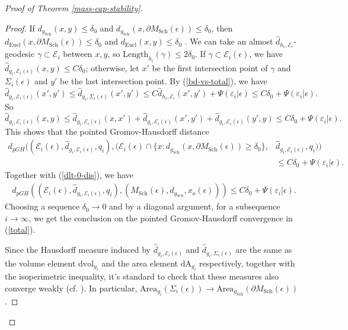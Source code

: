 \documentclass[letter]{amsart}
\theoremstyle{definition}
\theoremstyle{remark}
\def\Area{\mathrm{Area}}
\begin{document}
\begin{proof}[Proof of Theorem \ref{mass-cap-stability}]
\begin{proof}
If $d_{g_{\mathrm{Sch}}}(x,y) \leq \delta _0$ and $d_{g_{\mathrm{Sch}}}(x, \partial M_{\mathrm{Sch}}(\epsilon ) ) \leq \delta _0$, then $d_{\mathrm{Eucl}}(x, \partial M_{\mathrm{Sch}}(\epsilon ) ) \leq \delta _0$ and $d_{\mathrm{Eucl}}(x,y) \leq \delta _0$ . We can take an almost $\hat{d}_{h_i, \mathcal{E}_i}$-geodesic $\gamma \subset \mathcal{E}_i $ between $x,y$, so $\mathrm{Length}_{h_i}(\gamma ) \leq 2 \delta _0$. If $\gamma \subset \mathcal{E}_i(\epsilon )$, we have $\hat{d}_{g_i, \mathcal{E}_i(\epsilon )}(x,y) \leq C \delta _0$; otherwise, let $x'$ be the first intersection point of $\gamma $ and $\Sigma _i(\epsilon )$ and $y'$ be the last intersection point. By (\ref{bd-vs-total}), we have
$$\hat{d}_{g_i, \mathcal{E}_i(\epsilon )}(x', y') \leq \hat{d}_{g_i, \Sigma _i(\epsilon )}(x',y') \leq C \hat{d}_{h_i, \mathcal{E}_i}(x',y') + \Psi (\varepsilon _i|\epsilon ) \leq C \delta _0 + \Psi (\varepsilon _i|\epsilon ).$$ 
So 
$$\hat{d}_{g_i, \mathcal{E}_i(\epsilon )}(x,y) \leq \hat{d}_{g_i, \mathcal{E}_i(\epsilon )}(x,x') + \hat{d}_{g_i, \mathcal{E}_i(\epsilon )}(x',y') + \hat{d}_{g_i, \mathcal{E}_i(\epsilon )}(y',y) \leq C \delta _0 + \Psi (\varepsilon _i|\epsilon ).$$
This shows that the pointed Gromov-Hausdorff distance
\begin{align*}
	d_{pGH}((\mathcal{E}_i(\epsilon ), \hat{d}_{g_i, \mathcal{E}_i(\epsilon )}, q_i), (\mathcal{E}_i(\epsilon ) \cap \{ x: d_{g_{\mathrm{Sch}}}(x, \partial M_{\mathrm{Sch}}(\epsilon ) )\geq \delta _0\} , &\hat{d}_{g_i, \mathcal{E}_i(\epsilon )}, q_i) )\\
	&\leq C \delta _0 + \Psi (\varepsilon _i|\epsilon ).
\end{align*}
Together with (\ref{dlt-0-dis}), we have 
\begin{align*}
	d_{pGH}( (\mathcal{E}_i(\epsilon ) , \hat{d}_{g_i, \mathcal{E}_i(\epsilon )}, q_i), ( M_{\mathrm{Sch}}(\epsilon ), d_{g_{\mathrm{Sch}}}, x_o(\epsilon ) ) ) \leq C \delta _0 + \Psi (\varepsilon _i| \epsilon ).
\end{align*}
Choosing a sequence $\delta _0 \to 0$ and by a diagonal argument, for a subsequence $i\to \infty$, we get the conclusion on the pointed Gromov-Hausdorff convergence in (\ref{total}). 

Since the Hausdorff measure induced by $\hat{d}_{g_i, \mathcal{E}_i(\epsilon )}$ and $\hat{d}_{g_i, \Sigma_i(\epsilon )}$ are the same as the volume element $\mathrm{dvol}_{g_i}$ and the area element $\mathrm{dA}_{g_i}$ respectively, together with the isoperimetric inequality, it's standard to check that these measures also converge weakly (cf. \cite[Page 22]{DS'23}). In particular, $\Area_{g_i}(\Sigma _i(\epsilon ) ) \to \Area_{g_{\mathrm{Sch}}}(\partial M_{\mathrm{Sch}}(\epsilon ) )$.


\end{proof}
\end{proof}
\end{document}
